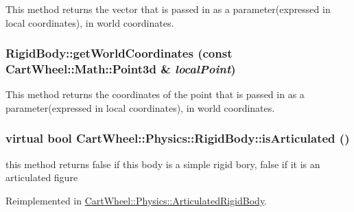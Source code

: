This method returns the vector that is passed in as a parameter(expressed in local coordinates), in world coordinates. \hypertarget{classCartWheel_1_1Physics_1_1RigidBody_ae83135dc1e3f7ab85541ce67d636af98}{
\subsubsection[{getWorldCoordinates}]{ RigidBody::getWorldCoordinates (const {\bf CartWheel::Math::Point3d} \& {\em localPoint})}}
\label{classCartWheel_1_1Physics_1_1RigidBody_ae83135dc1e3f7ab85541ce67d636af98}
This method returns the coordinates of the point that is passed in as a parameter(expressed in local coordinates), in world coordinates. \hypertarget{classCartWheel_1_1Physics_1_1RigidBody_aee97ae09ce1b2f4643b39d3422a4243d}{
\subsubsection[{isArticulated}]{\setlength{\rightskip}{0pt plus 5cm}virtual bool CartWheel::Physics::RigidBody::isArticulated ()}}
\label{classCartWheel_1_1Physics_1_1RigidBody_aee97ae09ce1b2f4643b39d3422a4243d}
this method returns false if this body is a simple rigid bory, false if it is an articulated figure 

Reimplemented in \hyperlink{classCartWheel_1_1Physics_1_1ArticulatedRigidBody_aeb046899adbf2017e32249b2a651d846}{CartWheel::Physics::ArticulatedRigidBody}.

